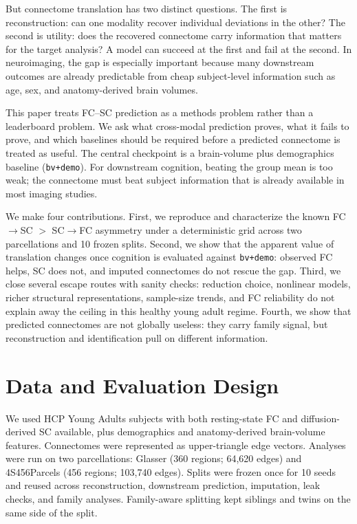 \documentclass{article}
\newcommand{\fcsc}{FC$\rightarrow$SC}
\newcommand{\scfc}{SC$\rightarrow$FC}
\newcommand{\bvdemo}{\texttt{bv+demo}}
\begin{document}
But connectome translation has two distinct questions. The first is reconstruction: can one modality recover individual deviations in the other? The second is utility: does the recovered connectome carry information that matters for the target analysis? A model can succeed at the first and fail at the second. In neuroimaging, the gap is especially important because many downstream outcomes are already predictable from cheap subject-level information such as age, sex, and anatomy-derived brain volumes.

This paper treats FC--SC prediction as a methods problem rather than a leaderboard problem. We ask what cross-modal prediction proves, what it fails to prove, and which baselines should be required before a predicted connectome is treated as useful. The central checkpoint is a brain-volume plus demographics baseline (\bvdemo). For downstream cognition, beating the group mean is too weak; the connectome must beat subject information that is already available in most imaging studies.

We make four contributions. First, we reproduce and characterize the known \fcsc{} $>$ \scfc{} asymmetry under a deterministic grid across two parcellations and 10 frozen splits. Second, we show that the apparent value of translation changes once cognition is evaluated against \bvdemo: observed FC helps, SC does not, and imputed connectomes do not rescue the gap. Third, we close several escape routes with sanity checks: reduction choice, nonlinear models, richer structural representations, sample-size trends, and FC reliability do not explain away the ceiling in this healthy young adult regime. Fourth, we show that predicted connectomes are not globally useless: they carry family signal, but reconstruction and identification pull on different information.

\section{Data and Evaluation Design}

We used HCP Young Adults subjects with both resting-state FC and diffusion-derived SC available, plus demographics and anatomy-derived brain-volume features. Connectomes were represented as upper-triangle edge vectors. Analyses were run on two parcellations: Glasser (360 regions; 64{,}620 edges) and 4S456Parcels (456 regions; 103{,}740 edges). Splits were frozen once for 10 seeds and reused across reconstruction, downstream prediction, imputation, leak checks, and family analyses. Family-aware splitting kept siblings and twins on the same side of the split.
\end{document}
